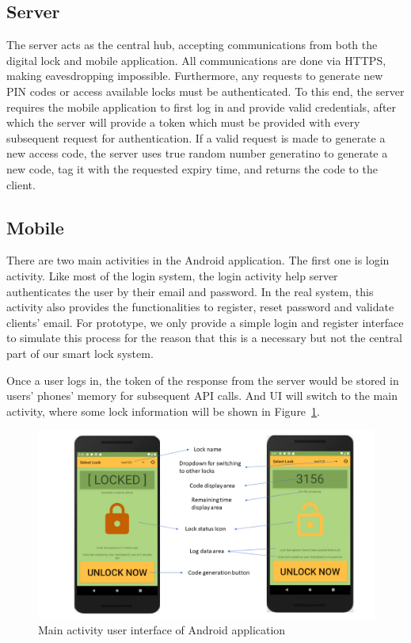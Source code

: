 \documentclass[conference]{IEEEtran}
\begin{document}
\subsection{Server}
The server acts as the central hub, accepting communications from both the digital lock and mobile application. All communications are done via HTTPS, making eavesdropping impossible. Furthermore, any requests to generate new PIN codes or access available locks must be authenticated. To this end, the server requires the mobile application to first log in and provide valid credentials, after which the server will provide a token which must be provided with every subsequent request for authentication. If a valid request is made to generate a new access code, the server uses true random number generatino to generate a new code, tag it with the requested expiry time, and returns the code to the client.

\subsection{Mobile}
There are two main activities in the Android application. The first one is login activity. Like most of the login system, the login activity help server authenticates the user by their email and password. In the real system, this activity also provides the functionalities to register, reset password and validate clients’ email. For prototype, we only provide a simple login and register interface to simulate this process for the reason that this is a necessary but not the central part of our smart lock system.

Once a user logs in, the token of the response from the server would be stored in users’ phones’ memory for subsequent API calls. And UI will switch to the main activity, where some lock information will be shown in Figure~\ref{fig:mainActivity}.

\begin{figure}[h]
\centerline{\includegraphics[width=\textwidth]{img/MainActivity.png}}
\caption{Main activity user interface of Android application}
\label{fig:mainActivity}
\end{figure}
\end{document}
